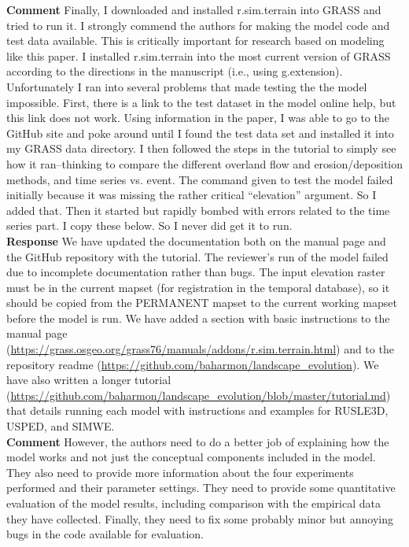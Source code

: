 \documentclass[gmd, manuscript]{copernicus}
\begin{document}
\noindent\textbf{Comment}
Finally, I downloaded and installed r.sim.terrain into GRASS and tried to run it. I strongly commend the authors for making the model code and test data available. This is critically important for research based on modeling like this paper. I installed r.sim.terrain into the most current version of GRASS according to the directions in the manuscript (i.e., using g.extension). Unfortunately I ran into several problems that made testing the the model impossible. First, there is a link to the test dataset in the model online help, but this link does not work. Using information in the paper, I was able to go to the GitHub site and poke around until I found the test data set and installed it into my GRASS data directory. I then followed the steps in the tutorial to simply see how it ran–thinking to compare the different overland flow and erosion/deposition methods, and time series vs. event. The command given to test the model failed initially because it was missing the rather critical ``elevation'' argument. So I added that. Then it started but rapidly bombed with errors related to the time series part. I copy these below. So I never did get it to run.
\\

\noindent\textbf{Response}
We have updated the documentation both on the manual page and the GitHub repository with the tutorial. The reviewer's run of the model failed due to incomplete documentation rather than bugs. The input elevation raster must be in the current mapset (for registration in the temporal database), so it should be copied from the PERMANENT mapset to the current working mapset before the model is run. We have added a section with basic instructions to the manual page (\url{https://grass.osgeo.org/grass76/manuals/addons/r.sim.terrain.html}) and to the repository readme (\url{https://github.com/baharmon/landscape_evolution}). We have also written a longer tutorial (\url{https://github.com/baharmon/landscape_evolution/blob/master/tutorial.md}) that details running each model with instructions and examples for RUSLE3D, USPED, and SIMWE.
\\

\noindent\textbf{Comment}
However, the authors need to do a better job of explaining how the model works and not just the conceptual components included in the model. They also need to provide more information about the four experiments performed and their parameter settings. They need to provide some quantitative evaluation of the model results, including comparison with the empirical data they have collected. Finally, they need to fix some probably minor but annoying bugs in the code available for evaluation.
\\
\end{document}
